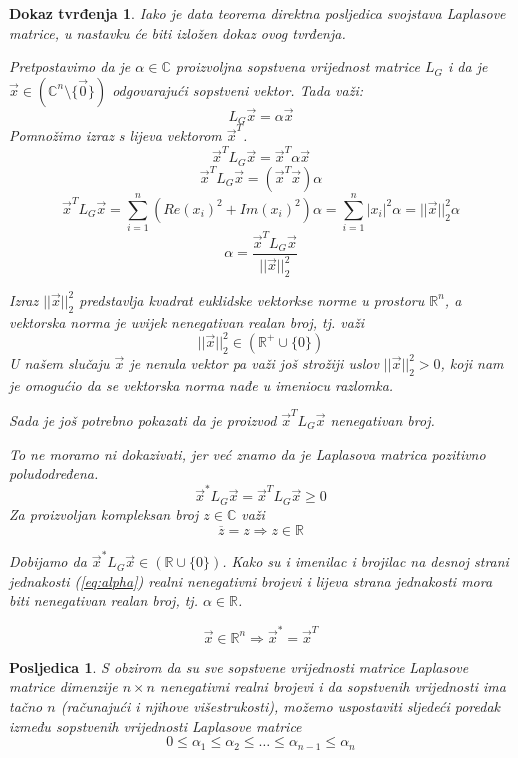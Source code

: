 \documentclass[11pt]{article}
\newtheorem*{custom_proof}{Dokaz tvrđenja}
\newtheorem{consequence}{Posljedica}
\begin{document}
	\begin{custom_proof}
	Iako je data teorema direktna posljedica svojstava Laplasove matrice, u nastavku će biti izložen dokaz ovog tvrđenja.
	
	Pretpostavimo da je $\alpha \in \mathbb{C}$ proizvoljna sopstvena vrijednost matrice $L_G$ i da je $\vec{x} \in (\mathbb{C}^n \setminus \{\vec{0}\})$ odgovarajući sopstveni vektor. Tada važi:
	\[
		L_G\vec{x} = \alpha \vec{x}
	\]
	Pomnožimo izraz s lijeva vektorom $\vec{x}^T$.
	\[
		\vec{x}^TL_G\vec{x} = \vec{x}^T\alpha \vec{x}
	\]
	\[
		\vec{x}^TL_G\vec{x} = (\vec{x}^T \vec{x}) \alpha
	\]
	\[
		\vec{x}^TL_G\vec{x} = \sum_{i=1}^{n}(Re(x_i)^2 + Im(x_i)^2 ) \alpha =  \sum_{i=1}^{n}|x_i|^2 \alpha= ||\vec{x}||_2^2 \alpha  
	\]
	\begin{equation}
		 \alpha =   \frac{\vec{x}^TL_G\vec{x}}{||\vec{x}||_2^2}
	\label{eq:alpha}
	\end{equation}

	Izraz $||\vec{x}||_2^2$ predstavlja kvadrat euklidske vektorkse norme u prostoru $\mathbb{R}^n$, a vektorska norma je uvijek nenegativan realan broj, tj. važi
	\[
		||\vec{x}||_2^2 \in (\mathbb{R}^+ \cup \{0\})  
	\]
	U našem slučaju $\vec{x}$ je nenula vektor pa važi još strožiji uslov $||\vec{x}||_2^2 > 0$, koji nam je omogućio da se vektorska norma nađe u imeniocu razlomka.
	
	Sada je još potrebno pokazati da je proizvod $\vec{x}^TL_G\vec{x}$ nenegativan broj.

	To ne moramo ni dokazivati, jer već znamo da je Laplasova matrica pozitivno poludodređena.
	\[
		\vec{x}^* L_G \vec{x} = \vec{x}^T L_G \vec{x} \geq 0
	\]
	Za proizvoljan kompleksan broj $z \in \mathbb{C}$ važi
	\[
	 \overline{z} = z \Rightarrow z \in \mathbb{R}
	\]

	Dobijamo da $\vec{x}^*L_G\vec{x} \in (\mathbb{R} \cup \{0\})$. Kako su i imenilac i brojilac na desnoj strani jednakosti (\ref{eq:alpha}) realni nenegativni brojevi i lijeva strana jednakosti mora biti nenegativan realan broj, tj. $\alpha \in \mathbb{R}$.

	\[
		\vec{x} \in \mathbb{R}^n \Rightarrow \vec{x}^* = \vec{x}^T
	\]

	\end{custom_proof}
	
	\begin{consequence}
	S obzirom da su sve sopstvene vrijednosti matrice Laplasove matrice dimenzije $n \times n$ nenegativni realni brojevi i da sopstvenih vrijednosti ima tačno $n$
	(računajući i njihove višestrukosti), možemo uspostaviti sljedeći poredak između sopstvenih vrijednosti Laplasove matrice 
	\[
	0 \leq \alpha_1 \leq \alpha_2 \leq \dots \leq \alpha_{n-1} \leq \alpha_n
	\]
	\end{consequence}
	
\end{document}
